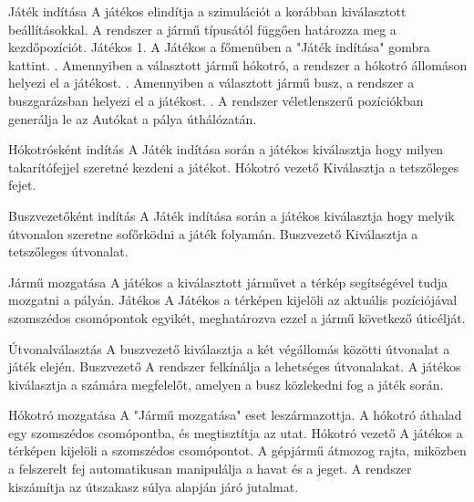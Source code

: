 \begin{use-case}
{Játék indítása}
{A játékos elindítja a szimulációt a korábban kiválasztott beállításokkal. A rendszer a jármű típusától függően határozza meg a kezdőpozíciót.}
{Játékos}
1. A Játékos a főmenüben a "Játék indítása" gombra kattint. . Amennyiben a választott jármű hókotró, a rendszer a hókotró állomáson helyezi el a játékost. . Amennyiben a választott jármű busz, a rendszer a buszgarázsban helyezi el a játékost. . A rendszer véletlenszerű pozíciókban generálja le az Autókat a pálya úthálózatán. \newline
\end{use-case}

\begin{use-case}
{Hókotrósként indítás}
{A Játék indítása során a játékos kiválasztja hogy milyen takarítófejjel szeretné kezdeni a játékot.}
{Hókotró vezető}
Kiválasztja a tetszőleges fejet.
\end{use-case}

\begin{use-case}
{Buszvezetőként indítás}
{A Játék indítása során a játékos kiválasztja hogy melyik útvonalon szeretne sofőrködni a játék folyamán.}
{Buszvezető}
Kiválasztja a tetszőleges útvonalat.
\end{use-case}

\begin{use-case}
{Jármű mozgatása}
{A játékos a kiválasztott járművet a térkép segítségével tudja mozgatni a pályán.}
{Játékos}
A Játékos a térképen kijelöli az aktuális pozíciójával szomszédos csomópontok egyikét, meghatározva ezzel a jármű következő úticélját.
\end{use-case}

\begin{use-case}
    {Útvonalválasztás}
    {A buszvezető kiválasztja a két végállomás közötti útvonalat a játék elején.}
    {Buszvezető}
    A rendszer felkínálja a lehetséges útvonalakat. A játékos kiválasztja a számára megfelelőt, amelyen a busz közlekedni fog a játék során.
\end{use-case}

\begin{use-case}
    {Hókotró mozgatása}
    {A "Jármű mozgatása" eset leszármazottja. A hókotró áthalad egy szomszédos csomópontba, és megtisztítja az utat.}
    {Hókotró vezető}
	A játékos a térképen kijelöli a szomszédos csomópontot. A gépjármű átmozog rajta, miközben a felszerelt fej automatikusan manipulálja a havat és a jeget. A rendszer kiszámítja az útszakasz súlya alapján járó jutalmat.
\end{use-case}

